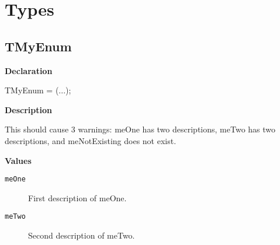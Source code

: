 \documentclass{report}
\begin{document}
\section{Types}
\subsection*{TMyEnum}
\begin{list}{}{
\setlength{\itemindent}{0cm}
\setlength{\listparindent}{0cm}
\setlength{\leftmargin}{\evensidemargin}
\addtolength{\leftmargin}{\tmplength}
\settowidth{\labelsep}{X}
\addtolength{\leftmargin}{\labelsep}
\setlength{\labelwidth}{\tmplength}
}
\begin{flushleft}
\item[\textbf{Declaration}\hfill]
\begin{ttfamily}
TMyEnum = (...);\end{ttfamily}


\end{flushleft}
\par
\item[\textbf{Description}]
 





This should cause 3 warnings: meOne has two descriptions, meTwo has two descriptions, and meNotExisting does not exist.\item[\textbf{Values}]
\begin{description}
\item[\texttt{meOne}] First description of meOne.
\item[\texttt{meTwo}] Second description of meTwo.
\end{description}


\end{list}
\end{document}
